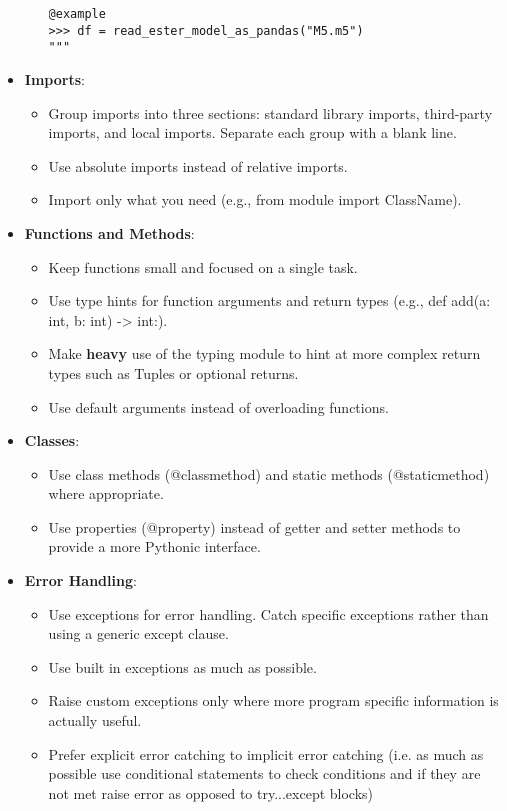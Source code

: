\documentclass{ol-softwaremanual}
\begin{document}
\begin{itemize}
\begin{itemize}
\begin{example}
\begin{verbatim}
@example
>>> df = read_ester_model_as_pandas("M5.m5")
"""
\end{verbatim}
\end{example}

\end{itemize}
\item \textbf{Imports}:
\begin{itemize}
        \item Group imports into three sections: standard library imports, third-party imports, and local imports. Separate each group with a blank line.
        \item Use absolute imports instead of relative imports.
        \item Import only what you need (e.g., from module import ClassName).
\end{itemize}
\item \textbf{Functions and Methods}:
\begin{itemize}
    \item Keep functions small and focused on a single task.
    \item Use type hints for function arguments and return types (e.g., def add(a: int, b: int) -> int:).
    \item Make \textbf{heavy} use of the typing module to hint at more complex return types such as Tuples or optional returns.
    \item Use default arguments instead of overloading functions.
\end{itemize}
\item \textbf{Classes}:
\begin{itemize}
    \item Use class methods (@classmethod) and static methods (@staticmethod) where appropriate.
    \item Use properties (@property) instead of getter and setter methods to provide a more Pythonic interface.
\end{itemize}
\item \textbf{Error Handling}:
\begin{itemize}
    \item Use exceptions for error handling. Catch specific exceptions rather than using a generic except clause.
    \item Use built in exceptions as much as possible.
    \item Raise custom exceptions only where more program specific information is actually useful.
    \item Prefer explicit error catching to implicit error catching (i.e. as much as possible use conditional statements to check conditions and if they are not met raise error as opposed to try...except blocks)
\end{itemize}


\end{itemize}
\end{document}
